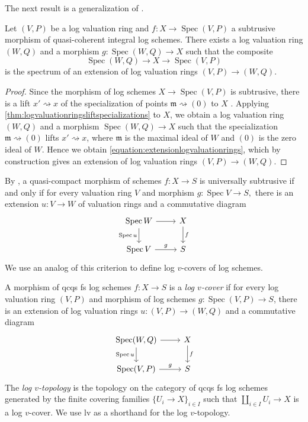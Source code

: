 \documentclass[10pt]{amsart}
\DeclareMathOperator{\Spec}{Spec}
\begin{document}
The next result is a generalization of \cite[Proposition 2.7 (vi)]{Rydh}.
\begin{lemma}\label{lem:extendinglogvaluationring}
Let $(V,P)$ be a log valuation ring and $f\colon X \to \Spec{(V,P)}$ 
a subtrusive morphism of quasi-coherent integral log schemes.
There exists a log valuation ring $(W,Q)$ and a morphism $g \colon \Spec{(W,Q)} \to X$ 
such that the composite
\begin{equation}
\label{equation:extensionlogvaluationrings}
\Spec{(W,Q)} \to X \to \Spec{(V,P)}
\end{equation}
is the spectrum of an extension of log valuation rings $(V,P) \to (W,Q)$.
\end{lemma}
\begin{proof}
Since the morphism of log schemes $X \to \Spec{(V,P)}$ is subtrusive, 
there is a lift $x' \rightsquigarrow x$ of the specialization of points 
$\mathfrak{m} \rightsquigarrow (0)$ to $X$ \cite[Proposition 2.7]{Rydh}. 
Applying \cref{thm:logvaluationringsliftspecializations} to $X$, 
we obtain a log valuation ring $(W,Q)$ and a morphism $\Spec(W,Q)\to X$ 
such that the specialization $\mathfrak{m} \rightsquigarrow (0)$ lifts $x' \rightsquigarrow x$,
where $\mathfrak{m}$ is the maximal ideal of $W$ and $(0)$ is the zero ideal of $W$.
Hence we obtain \eqref{equation:extensionlogvaluationrings}, 
which by construction gives an extension of log valuation rings $(V,P) \to (W,Q)$.
\end{proof}

By \cite[Corollary 2.9]{Rydh}, a quasi-compact morphism of schemes $f\colon X \to S$ is universally subtrusive if and only if for every valuation ring $V$ and morphism $g\colon \Spec{V} \to S,$
there is an extension $u\colon V\to W$ of valuation rings
and a commutative diagram
$$
\begin{tikzcd}
\Spec{W} \ar[r] \ar[d,"\Spec{u}"'] & X \ar[d, "f"] \\
\Spec{V} \ar[r,"g"] & S
\end{tikzcd}
$$
We use an analog of this criterion to define log $v$-covers of log schemes.

\begin{definition}
\label{v.4}
A morphism of
qcqs fs log schemes $f\colon X\to S$ is a \emph{log $v$-cover} if for every log valuation ring $(V,P)$ 
and morphism of log schemes $g\colon \Spec(V,P)\to S$,
there is an extension of log valuation rings $u\colon (V,P)\to (W,Q)$
and a commutative diagram
\begin{equation}
\label{v.4.1}
\begin{tikzcd}
\Spec(W,Q)\ar[r]\ar[d,"\Spec{u}"']&
X\ar[d,"f"]
\\
\Spec(V,P)\ar[r,"g"]&
S
\end{tikzcd}
\end{equation}
The \emph{log $v$-topology} is the topology on the category of qcqs fs log schemes 
generated by the finite covering families $\{U_i\to X\}_{i\in I}$ such that 
$\amalg_{i\in I}U_i\to X$ is a log $v$-cover. 
We use lv as a shorthand for the log $v$-topology.
\end{definition}
\end{document}
